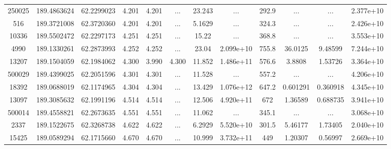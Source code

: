 \begin{table*}
\begin{tabular}{cccccccccccc}
         250025 &     189.4863624 &      62.2299023 &           4.201 &           4.201 &             ... &          23.243 &             ... &           292.9 &             ... &             ... &       2.377e+10 \\
            516 &     189.3721008 &      62.3720360 &           4.201 &           4.201 &             ... &          5.1629 &             ... &           324.3 &             ... &             ... &       2.426e+10 \\
          10336 &     189.5502472 &      62.2297173 &           4.251 &           4.251 &             ... &           15.22 &             ... &           368.8 &             ... &             ... &       3.553e+10 \\
           4990 &     189.1330261 &      62.2873993 &           4.252 &           4.252 &             ... &           23.04 &       2.099e+10 &           755.8 &         36.0125 &         9.48599 &       7.244e+10 \\
          13207 &     189.1504059 &      62.1984062 &           4.300 &           3.990 &           4.300 &          11.852 &       1.486e+11 &           576.6 &          3.8808 &         1.53726 &       3.364e+10 \\
         500029 &     189.4399025 &      62.2051596 &           4.301 &           4.301 &             ... &          11.528 &             ... &           557.2 &             ... &             ... &       4.206e+10 \\
          18392 &     189.0688019 &      62.1174965 &           4.304 &           4.304 &             ... &          13.429 &       1.076e+12 &           647.2 &        0.601291 &        0.360918 &       4.345e+10 \\
          13097 &     189.3085632 &      62.1991196 &           4.514 &           4.514 &             ... &          12.506 &       4.920e+11 &             672 &         1.36589 &        0.688735 &       3.941e+10 \\
         500014 &     189.4558821 &      62.2673635 &           4.551 &           4.551 &             ... &          11.062 &             ... &           345.1 &             ... &             ... &       3.068e+10 \\
           2337 &     189.1522675 &      62.3268738 &           4.622 &           4.622 &             ... &          6.2929 &       5.520e+10 &           301.5 &         5.46177 &         1.73405 &       2.040e+10 \\
          15425 &     189.0589294 &      62.1715660 &           4.670 &           4.670 &             ... &          10.999 &       3.732e+11 &             449 &         1.20307 &         0.56997 &       2.669e+10 \\

\end{tabular}
\end{table*}
